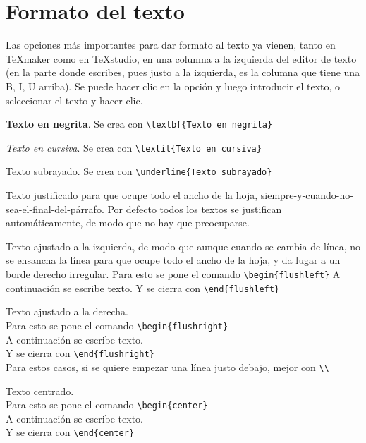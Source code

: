 \chapter{Formato del texto}

Las opciones más importantes para dar formato al texto ya vienen, tanto en TeXmaker como en TeXstudio, en una columna a la izquierda del editor de texto (en la parte donde escribes, pues justo a la izquierda, es la columna que tiene una B, I, U arriba). Se puede hacer clic en la opción y luego introducir el texto, o seleccionar el texto y hacer clic.

\textbf{Texto en negrita}. Se crea con \verb!\textbf{Texto en negrita}!

\textit{Texto en cursiva}. Se crea con \verb!\textit{Texto en cursiva}!

\underline{Texto subrayado}. Se crea con \verb!\underline{Texto subrayado}!

Texto justificado para que ocupe todo el ancho de la hoja, siempre-y-cuando-no-sea-el-final-del-párrafo. Por defecto todos los textos se justifican automáticamente, de modo que no hay que preocuparse.

\begin{flushleft}
	Texto ajustado a la izquierda, de modo que aunque cuando se cambia de línea, no se ensancha la línea para que ocupe todo el ancho de la hoja, y da lugar a un borde derecho irregular. \newline
	Para esto se pone el comando \verb!\begin{flushleft}! \newline
	A continuación se escribe texto. \newline
	Y se cierra con \verb!\end{flushleft}!
\end{flushleft}

\begin{flushright}
	Texto ajustado a la derecha. \\
	Para esto se pone el comando \verb!\begin{flushright}! \\
	A continuación se escribe texto. \\
	Y se cierra con \verb!\end{flushright}! \\
	Para estos casos, si se quiere empezar una línea justo debajo, mejor con \verb!\\!
\end{flushright}

\begin{center}
	Texto centrado.\\
	Para esto se pone el comando \verb!\begin{center}! \\
	A continuación se escribe texto. \\
	Y se cierra con \verb!\end{center}!
\end{center}

